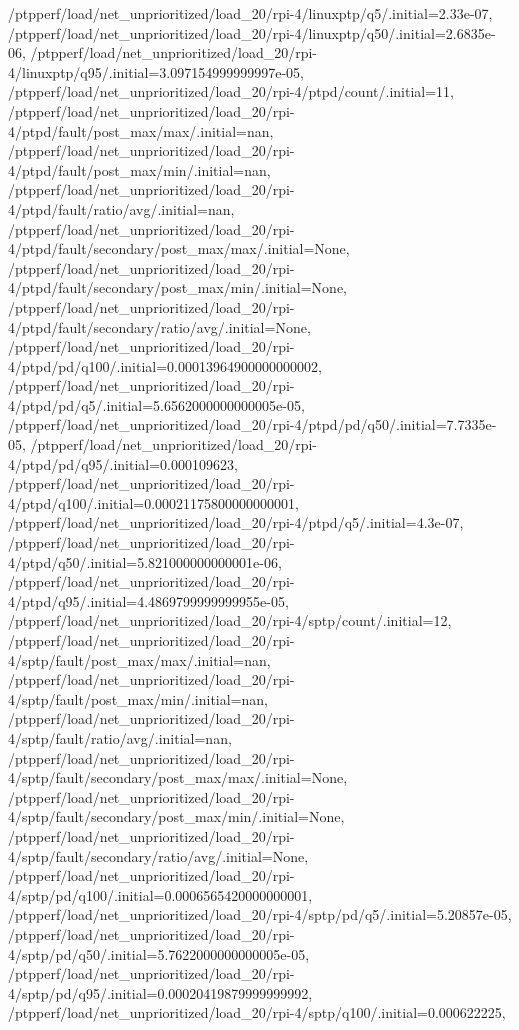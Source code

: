 {    /ptpperf/load/net_unprioritized/load_20/rpi-4/linuxptp/q5/.initial=2.33e-07,
    /ptpperf/load/net_unprioritized/load_20/rpi-4/linuxptp/q50/.initial=2.6835e-06,
    /ptpperf/load/net_unprioritized/load_20/rpi-4/linuxptp/q95/.initial=3.097154999999997e-05,
    /ptpperf/load/net_unprioritized/load_20/rpi-4/ptpd/count/.initial=11,
    /ptpperf/load/net_unprioritized/load_20/rpi-4/ptpd/fault/post_max/max/.initial=nan,
    /ptpperf/load/net_unprioritized/load_20/rpi-4/ptpd/fault/post_max/min/.initial=nan,
    /ptpperf/load/net_unprioritized/load_20/rpi-4/ptpd/fault/ratio/avg/.initial=nan,
    /ptpperf/load/net_unprioritized/load_20/rpi-4/ptpd/fault/secondary/post_max/max/.initial=None,
    /ptpperf/load/net_unprioritized/load_20/rpi-4/ptpd/fault/secondary/post_max/min/.initial=None,
    /ptpperf/load/net_unprioritized/load_20/rpi-4/ptpd/fault/secondary/ratio/avg/.initial=None,
    /ptpperf/load/net_unprioritized/load_20/rpi-4/ptpd/pd/q100/.initial=0.00013964900000000002,
    /ptpperf/load/net_unprioritized/load_20/rpi-4/ptpd/pd/q5/.initial=5.6562000000000005e-05,
    /ptpperf/load/net_unprioritized/load_20/rpi-4/ptpd/pd/q50/.initial=7.7335e-05,
    /ptpperf/load/net_unprioritized/load_20/rpi-4/ptpd/pd/q95/.initial=0.000109623,
    /ptpperf/load/net_unprioritized/load_20/rpi-4/ptpd/q100/.initial=0.00021175800000000001,
    /ptpperf/load/net_unprioritized/load_20/rpi-4/ptpd/q5/.initial=4.3e-07,
    /ptpperf/load/net_unprioritized/load_20/rpi-4/ptpd/q50/.initial=5.821000000000001e-06,
    /ptpperf/load/net_unprioritized/load_20/rpi-4/ptpd/q95/.initial=4.4869799999999955e-05,
    /ptpperf/load/net_unprioritized/load_20/rpi-4/sptp/count/.initial=12,
    /ptpperf/load/net_unprioritized/load_20/rpi-4/sptp/fault/post_max/max/.initial=nan,
    /ptpperf/load/net_unprioritized/load_20/rpi-4/sptp/fault/post_max/min/.initial=nan,
    /ptpperf/load/net_unprioritized/load_20/rpi-4/sptp/fault/ratio/avg/.initial=nan,
    /ptpperf/load/net_unprioritized/load_20/rpi-4/sptp/fault/secondary/post_max/max/.initial=None,
    /ptpperf/load/net_unprioritized/load_20/rpi-4/sptp/fault/secondary/post_max/min/.initial=None,
    /ptpperf/load/net_unprioritized/load_20/rpi-4/sptp/fault/secondary/ratio/avg/.initial=None,
    /ptpperf/load/net_unprioritized/load_20/rpi-4/sptp/pd/q100/.initial=0.0006565420000000001,
    /ptpperf/load/net_unprioritized/load_20/rpi-4/sptp/pd/q5/.initial=5.20857e-05,
    /ptpperf/load/net_unprioritized/load_20/rpi-4/sptp/pd/q50/.initial=5.7622000000000005e-05,
    /ptpperf/load/net_unprioritized/load_20/rpi-4/sptp/pd/q95/.initial=0.00020419879999999992,
    /ptpperf/load/net_unprioritized/load_20/rpi-4/sptp/q100/.initial=0.000622225,
}
